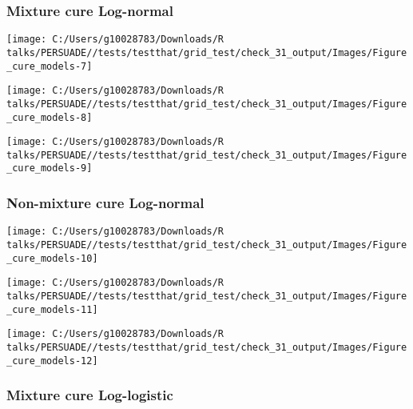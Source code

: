 \documentclass[
]{article}
\begin{document}
\subsubsection{Mixture cure Log-normal}\label{mixture-cure-log-normal}

\begin{flushleft}\texttt{[image: C:/Users/g10028783/Downloads/R talks/PERSUADE//tests/testthat/grid\_test/check\_31\_output/Images/Figure\_cure\_models-7]} \end{flushleft}

\begin{flushleft}\texttt{[image: C:/Users/g10028783/Downloads/R talks/PERSUADE//tests/testthat/grid\_test/check\_31\_output/Images/Figure\_cure\_models-8]} \end{flushleft}

\begin{flushleft}\texttt{[image: C:/Users/g10028783/Downloads/R talks/PERSUADE//tests/testthat/grid\_test/check\_31\_output/Images/Figure\_cure\_models-9]} \end{flushleft}

\clearpage

\subsubsection{Non-mixture cure
Log-normal}\label{non-mixture-cure-log-normal}

\begin{flushleft}\texttt{[image: C:/Users/g10028783/Downloads/R talks/PERSUADE//tests/testthat/grid\_test/check\_31\_output/Images/Figure\_cure\_models-10]} \end{flushleft}

\begin{flushleft}\texttt{[image: C:/Users/g10028783/Downloads/R talks/PERSUADE//tests/testthat/grid\_test/check\_31\_output/Images/Figure\_cure\_models-11]} \end{flushleft}

\begin{flushleft}\texttt{[image: C:/Users/g10028783/Downloads/R talks/PERSUADE//tests/testthat/grid\_test/check\_31\_output/Images/Figure\_cure\_models-12]} \end{flushleft}

\clearpage

\subsubsection{Mixture cure
Log-logistic}\label{mixture-cure-log-logistic}
\end{document}
